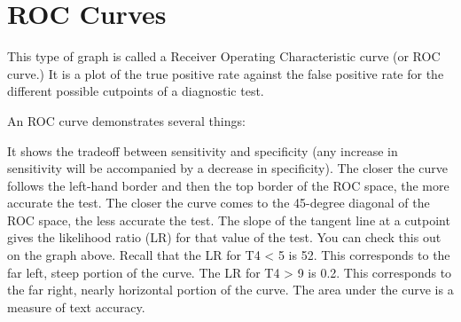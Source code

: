 

\section{ROC Curves}


This type of graph is called a Receiver Operating Characteristic curve (or ROC curve.) It is a plot of the true positive rate against the false positive rate for the different possible cutpoints of a diagnostic test.

An ROC curve demonstrates several things:

It shows the tradeoff between sensitivity and specificity (any increase in sensitivity will be accompanied by a decrease in specificity).
The closer the curve follows the left-hand border and then the top border of the ROC space, the more accurate the test.
The closer the curve comes to the 45-degree diagonal of the ROC space, the less accurate the test.
The slope of the tangent line at a cutpoint gives the likelihood ratio (LR) for that value of the test. You can check this out on the graph above. Recall that the LR for T4 < 5 is 52. This corresponds to the far left, steep portion of the curve. The LR for T4 > 9 is 0.2. This corresponds to the far right, nearly horizontal portion of the curve.
The area under the curve is a measure of text accuracy.




